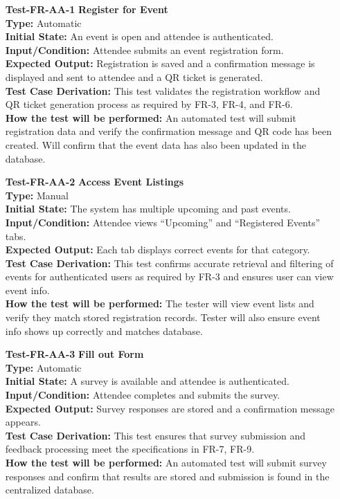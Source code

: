 \documentclass[12pt, titlepage]{article}
\begin{document}
\begin{enumerate}

\item[\textbf{Test-FR-AA-1}] \textbf{Register for Event}\\
\textbf{Type:} Automatic\\
\textbf{Initial State:} An event is open and attendee is authenticated.\\
\textbf{Input/Condition:} Attendee submits an event registration form.\\
\textbf{Expected Output:} Registration is saved and a confirmation message is displayed and sent to attendee and a QR ticket is generated.\\
\textbf{Test Case Derivation:} This test validates the registration workflow and QR ticket generation process as required by FR-3, FR-4, and FR-6.\\
\textbf{How the test will be performed:} An automated test will submit registration data and verify the confirmation message and QR code has been created. Will confirm that the event data has also been updated in the database.\\[6pt]

\item[\textbf{Test-FR-AA-2}] \textbf{Access Event Listings}\\
\textbf{Type:} Manual\\
\textbf{Initial State:} The system has multiple upcoming and past events.\\
\textbf{Input/Condition:} Attendee views ``Upcoming'' and ``Registered Events'' tabs.\\
\textbf{Expected Output:} Each tab displays correct events for that category.\\
\textbf{Test Case Derivation:} This test confirms accurate retrieval and filtering of events for authenticated users as required by FR-3 and ensures user can view event info.\\
\textbf{How the test will be performed:} The tester will view event lists and verify they match stored registration records. Tester will also ensure event info shows up correctly and matches database.\\[6pt]

\item[\textbf{Test-FR-AA-3}] \textbf{Fill out Form}\\
\textbf{Type:} Automatic\\
\textbf{Initial State:} A survey is available and attendee is authenticated.\\
\textbf{Input/Condition:} Attendee completes and submits the survey.\\
\textbf{Expected Output:} Survey responses are stored and a confirmation message appears.\\
\textbf{Test Case Derivation:} This test ensures that survey submission and feedback processing meet the specifications in FR-7, FR-9.\\
\textbf{How the test will be performed:} An automated test will submit survey responses and confirm that results are stored and submission is found in the centralized database.\\[12pt]

\end{enumerate}
\end{document}
